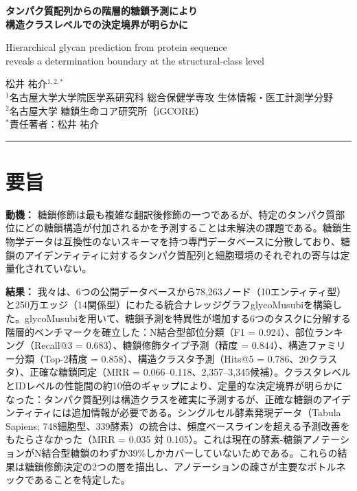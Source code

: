 \documentclass[11pt,a4paper]{ltjsarticle}
\newcommand{\HRule}{\rule{\linewidth}{0.4pt}}
\begin{document}
\begin{center}
{\LARGE\bfseries タンパク質配列からの階層的糖鎖予測により\\
構造クラスレベルでの決定境界が明らかに}

\vspace{0.5em}
{\large Hierarchical glycan prediction from protein sequence\\
reveals a determination boundary at the structural-class level}

\vspace{1em}
{\large 松井 祐介$^{1,2,*}$}\\[0.3em]
{\normalsize $^1$名古屋大学大学院医学系研究科 総合保健学専攻 生体情報・医工計測学分野\\
$^2$名古屋大学 糖鎖生命コア研究所（iGCORE）}\\[0.3em]
{\normalsize $^*$責任著者：松井 祐介}
\end{center}
\HRule
\vspace{0.5em}

\section*{要旨}

\textbf{動機：}
糖鎖修飾は最も複雑な翻訳後修飾の一つであるが、特定のタンパク質部位にどの糖鎖構造が付加されるかを予測することは未解決の課題である。糖鎖生物学データは互換性のないスキーマを持つ専門データベースに分散しており、糖鎖のアイデンティティに対するタンパク質配列と細胞環境のそれぞれの寄与は定量化されていない。

\textbf{結果：}
我々は、6つの公開データベースから78,263ノード（10エンティティ型）と250万エッジ（14関係型）にわたる統合ナレッジグラフglycoMusubiを構築した。glycoMusubiを用いて、糖鎖予測を特異性が増加する6つのタスクに分解する階層的ベンチマークを確立した：N結合型部位分類（F1 = 0.924）、部位ランキング（Recall@3 = 0.683）、糖鎖修飾タイプ予測（精度 = 0.844）、構造ファミリー分類（Top-2精度 = 0.858）、構造クラスタ予測（Hits@5 = 0.786、20クラスタ）、正確な糖鎖同定（MRR = 0.066--0.118、2,357--3,345候補）。クラスタレベルとIDレベルの性能間の約10倍のギャップにより、定量的な決定境界が明らかになった：タンパク質配列は構造クラスを確実に予測するが、正確な糖鎖のアイデンティティには追加情報が必要である。シングルセル酵素発現データ（Tabula Sapiens; 748細胞型、339酵素）の統合は、頻度ベースラインを超える予測改善をもたらさなかった（MRR = 0.035 対 0.105）。これは現在の酵素-糖鎖アノテーションがN結合型糖鎖のわずか39\%しかカバーしていないためである。これらの結果は糖鎖修飾決定の2つの層を描出し、アノテーションの疎さが主要なボトルネックであることを特定した。
\end{document}
